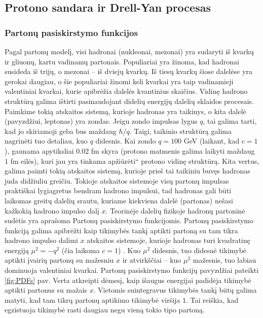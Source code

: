 \documentclass[a4paper, 12pt]{article}
\newcommand{\ltq}[1]{{\quotedblbase{}#1\textquotedblleft{}}}
\newlength\q
\begin{document}
\subsection{Protono sandara ir Drell-Yan procesas}

\subsubsection{Partonų pasiskirstymo funkcijos}
Pagal partonų modelį, visi hadronai (nukleonai, mezonai) yra sudaryti iš kvarkų ir gliuonų, kartu vadinamų partonais. Populiariai yra žinoma, kad hadronai susideda iš trijų, o mezonai -- iš dviejų kvarkų. Iš tiesų kvarkų šiose dalelėse yra gerokai daugiau, o šie populiariai žinomi keli kvarkai yra taip vadinamieji valentiniai kvarkai, kurie apibrėžia dalelės kvantinius skaičius. Vidinę hadrono struktūrą galima ištirti pasinaudojant didelių energijų dalelių sklaidos procesais. Paimkime tokią atskaitos sistemą, kurioje hadronas yra taikinys, o kita dalelė (pavyzdžiui, leptonas) yra zondas. Jeigu zondo impulsas lygus $q$, tai galima tarti, kad jo skiriamoji geba bus maždaug $\hbar / q$. Taigi, taikinio struktūrą galima nagrinėti tuo detaliau, kuo $q$ didesnis. Kai zondo $q=100$ GeV (laikant, kad $c=1$), gaunama apytiksliai $0.02$ fm skyra (protono matmenis galima laikyti maždaug $1$ fm eilės), kuri jau yra tinkama \ltq{apžiūrėti} protono vidinę struktūrą. Kita vertus, galima paimti tokią atskaitos sistemą, kurioje prieš tai taikiniu buvęs hadronas juda didžiuliu greičiu. Tokioje atskaitos sistemoje visų partonų impulsas praktiškai lygiagretus bendram hadrono impulsui, tad hadronas gali būti laikomas greitų dalelių srautu, kuriame kiekviena dalelė (partonas) nešasi kažkokią hadrono impulso dalį $x$. Teorinėje dalelių fizikoje hadronų partoninė sudėtis yra aprašoma Partonų pasiskirstymo funkcijomis. Partonų pasiskirstymo funkciją galima apibrėžti kaip tikimybės tankį aptikti partoną su tam tikra hadrono impulso dalimi $x$ atskaitos sistemoje, kurioje hadronas turi kvadratinę energiją $\mu^{2}=-q^{2}$ (čia laikoma $c=1$) \cite{PDFintro}. Kuo $\mu^{2}$ didesnis, tuo didesnė tikimybė aptikti įvairių partonų su mažesniu $x$ ir atvirkščiai -- kuo $\mu^{2}$ mažesnis, tuo labiau dominuoja valentiniai kvarkai. Partonų pasiskirstymo funkcijų pavyzdžiai pateikti \ref{fig:PDFs} pav. Verta atkreipti dėmesį, kaip išaugus energijai padidėja tikimybė aptikti partonus su mažais $x$. Vietomis suintegravus tikimybės tankį būtų galima matyti, kad tam tikrų partonų aptikimo tikimybė viršija $1$. Tai reiškia, kad egzistuoja tikimybė rasti daugiau negu vieną tokio tipo partoną.
\end{document}
